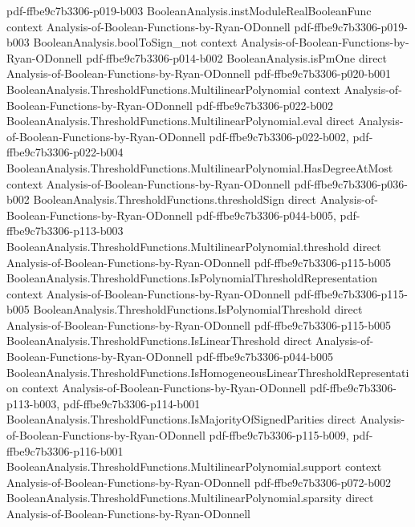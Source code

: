 \begin{theorem}
  {pdf-ffbe9c7b3306-p019-b003}
\proofstep
  {BooleanAnalysis.instModuleRealBooleanFunc}
  {context}
  {Analysis-of-Boolean-Functions-by-Ryan-ODonnell}
  {pdf-ffbe9c7b3306-p019-b003}
\proofstep
  {BooleanAnalysis.boolToSign_not}
  {context}
  {Analysis-of-Boolean-Functions-by-Ryan-ODonnell}
  {pdf-ffbe9c7b3306-p014-b002}
\proofstep
  {BooleanAnalysis.isPmOne}
  {direct}
  {Analysis-of-Boolean-Functions-by-Ryan-ODonnell}
  {pdf-ffbe9c7b3306-p020-b001}
\proofstep
  {BooleanAnalysis.ThresholdFunctions.MultilinearPolynomial}
  {context}
  {Analysis-of-Boolean-Functions-by-Ryan-ODonnell}
  {pdf-ffbe9c7b3306-p022-b002}
\proofstep
  {BooleanAnalysis.ThresholdFunctions.MultilinearPolynomial.eval}
  {direct}
  {Analysis-of-Boolean-Functions-by-Ryan-ODonnell}
  {pdf-ffbe9c7b3306-p022-b002,
    pdf-ffbe9c7b3306-p022-b004}
\proofstep
  {BooleanAnalysis.ThresholdFunctions.MultilinearPolynomial.HasDegreeAtMost}
  {context}
  {Analysis-of-Boolean-Functions-by-Ryan-ODonnell}
  {pdf-ffbe9c7b3306-p036-b002}
\proofstep
  {BooleanAnalysis.ThresholdFunctions.thresholdSign}
  {direct}
  {Analysis-of-Boolean-Functions-by-Ryan-ODonnell}
  {pdf-ffbe9c7b3306-p044-b005,
    pdf-ffbe9c7b3306-p113-b003}
\proofstep
  {BooleanAnalysis.ThresholdFunctions.MultilinearPolynomial.threshold}
  {direct}
  {Analysis-of-Boolean-Functions-by-Ryan-ODonnell}
  {pdf-ffbe9c7b3306-p115-b005}
\proofstep
  {BooleanAnalysis.ThresholdFunctions.IsPolynomialThresholdRepresentation}
  {context}
  {Analysis-of-Boolean-Functions-by-Ryan-ODonnell}
  {pdf-ffbe9c7b3306-p115-b005}
\proofstep
  {BooleanAnalysis.ThresholdFunctions.IsPolynomialThreshold}
  {direct}
  {Analysis-of-Boolean-Functions-by-Ryan-ODonnell}
  {pdf-ffbe9c7b3306-p115-b005}
\proofstep
  {BooleanAnalysis.ThresholdFunctions.IsLinearThreshold}
  {direct}
  {Analysis-of-Boolean-Functions-by-Ryan-ODonnell}
  {pdf-ffbe9c7b3306-p044-b005}
\proofstep
  {BooleanAnalysis.ThresholdFunctions.IsHomogeneousLinearThresholdRepresentation}
  {context}
  {Analysis-of-Boolean-Functions-by-Ryan-ODonnell}
  {pdf-ffbe9c7b3306-p113-b003,
    pdf-ffbe9c7b3306-p114-b001}
\proofstep
  {BooleanAnalysis.ThresholdFunctions.IsMajorityOfSignedParities}
  {direct}
  {Analysis-of-Boolean-Functions-by-Ryan-ODonnell}
  {pdf-ffbe9c7b3306-p115-b009,
    pdf-ffbe9c7b3306-p116-b001}
\proofstep
  {BooleanAnalysis.ThresholdFunctions.MultilinearPolynomial.support}
  {context}
  {Analysis-of-Boolean-Functions-by-Ryan-ODonnell}
  {pdf-ffbe9c7b3306-p072-b002}
\proofstep
  {BooleanAnalysis.ThresholdFunctions.MultilinearPolynomial.sparsity}
  {direct}
  {Analysis-of-Boolean-Functions-by-Ryan-ODonnell}

\end{theorem}
